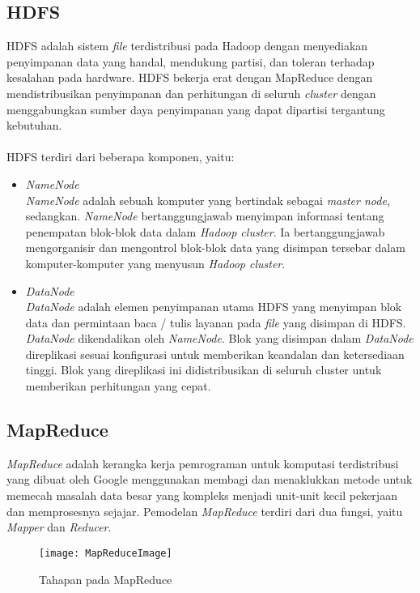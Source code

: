 \subsection{HDFS}
HDFS adalah sistem \textit{file} terdistribusi pada Hadoop dengan menyediakan penyimpanan data yang handal, mendukung partisi, dan toleran terhadap kesalahan pada hardware. HDFS bekerja erat dengan MapReduce dengan mendistribusikan penyimpanan dan perhitungan di seluruh \textit{cluster} dengan menggabungkan sumber daya penyimpanan yang dapat dipartisi tergantung kebutuhan. 
\\\\
HDFS terdiri dari beberapa komponen, yaitu:

\begin{itemize}
\item \textit{NameNode}\\
\textit{NameNode} adalah sebuah komputer yang bertindak sebagai \textit{master node}, sedangkan. \textit{NameNode} bertanggungjawab menyimpan informasi tentang penempatan blok-blok data dalam \textit{Hadoop cluster}. Ia bertanggungjawab mengorganisir dan mengontrol blok-blok data yang disimpan tersebar dalam komputer-komputer yang menyusun \textit{Hadoop cluster}. 

\item \textit{DataNode}\\
\textit{DataNode} adalah elemen penyimpanan utama HDFS yang menyimpan blok data dan permintaan baca / tulis layanan pada \textit{file} yang disimpan di HDFS. \textit{DataNode} dikendalikan oleh \textit{NameNode}. Blok yang disimpan dalam \textit{DataNode} direplikasi sesuai konfigurasi untuk memberikan keandalan dan ketersediaan tinggi. Blok yang direplikasi ini didistribusikan di seluruh cluster untuk memberikan perhitungan yang cepat.
\end{itemize}

\subsection{MapReduce}
\textit{MapReduce} adalah kerangka kerja pemrograman untuk komputasi terdistribusi yang dibuat oleh Google menggunakan membagi dan menaklukkan metode untuk memecah masalah data besar yang kompleks menjadi unit-unit kecil pekerjaan dan memprosesnya sejajar. Pemodelan \textit{MapReduce} terdiri dari dua fungsi, yaitu \textit{Mapper} dan \textit{Reducer}. 

\begin{figure}[H]
	\centering
	\texttt{[image: MapReduceImage]}
	\caption{Tahapan pada MapReduce}
	\label{fig:MapReduceImage}
\end{figure}

